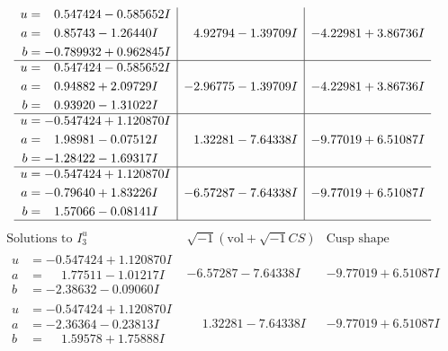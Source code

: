 \documentclass[1p]{elsarticle_modified}
\theoremstyle{definition}
\newcommand{\I}{\sqrt{-1}}
\begin{document}
$$\begin{array}{c|c|c}
\begin{aligned}
u &= \phantom{-}0.547424 - 0.585652 I \\
a &= \phantom{-}0.85743 - 1.26440 I \\
b &= -0.789932 + 0.962845 I\end{aligned}
 & \phantom{-}4.92794 - 1.39709 I & -4.22981 + 3.86736 I \\ \hline\begin{aligned}
u &= \phantom{-}0.547424 - 0.585652 I \\
a &= \phantom{-}0.94882 + 2.09729 I \\
b &= \phantom{-}0.93920 - 1.31022 I\end{aligned}
 & -2.96775 - 1.39709 I & -4.22981 + 3.86736 I \\ \hline\begin{aligned}
u &= -0.547424 + 1.120870 I \\
a &= \phantom{-}1.98981 - 0.07512 I \\
b &= -1.28422 - 1.69317 I\end{aligned}
 & \phantom{-}1.32281 - 7.64338 I & -9.77019 + 6.51087 I \\ \hline\begin{aligned}
u &= -0.547424 + 1.120870 I \\
a &= -0.79640 + 1.83226 I \\
b &= \phantom{-}1.57066 - 0.08141 I\end{aligned}
 & -6.57287 - 7.64338 I & -9.77019 + 6.51087 I\\
 \hline 
 \end{array}$$\newpage$$\begin{array}{c|c|c}  
\text{Solutions to }I^u_{3}& \I (\text{vol} + \sqrt{-1}CS) & \text{Cusp shape}\\
 \hline 
\begin{aligned}
u &= -0.547424 + 1.120870 I \\
a &= \phantom{-}1.77511 - 1.01217 I \\
b &= -2.38632 - 0.09060 I\end{aligned}
 & -6.57287 - 7.64338 I & -9.77019 + 6.51087 I \\ \hline\begin{aligned}
u &= -0.547424 + 1.120870 I \\
a &= -2.36364 - 0.23813 I \\
b &= \phantom{-}1.59578 + 1.75888 I\end{aligned}
 & \phantom{-}1.32281 - 7.64338 I & -9.77019 + 6.51087 I \\ \hline\begin{aligned}

\end{aligned}
\end{array}$$
\end{document}
